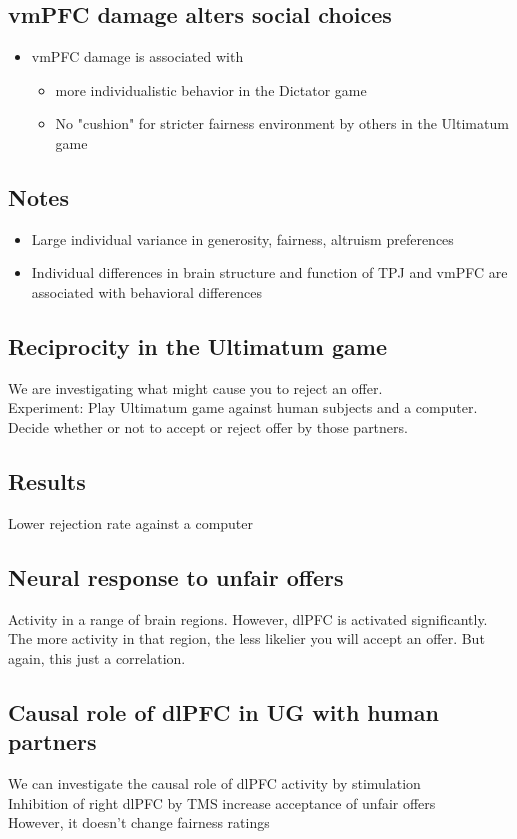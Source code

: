  \subsection{vmPFC damage alters social choices}
 \begin{itemize}
     \item vmPFC damage is associated with
     \begin{itemize}
         \item more individualistic behavior in the Dictator game
         \item No "cushion" for stricter fairness environment by others in the Ultimatum game
     \end{itemize}
 \end{itemize}

 \subsection{Notes}
 \begin{itemize}
     \item Large individual variance in generosity, fairness, altruism preferences
     \item Individual differences in brain structure and function of TPJ and vmPFC are associated with behavioral differences
 \end{itemize}
 \subsection{Reciprocity in the Ultimatum game}
 We are investigating what might cause you to reject an offer.
 \\Experiment: Play Ultimatum game against human subjects and a computer. Decide whether or not to accept or reject offer by those partners.
 \subsection{Results}
 Lower rejection rate against a computer
 \subsection{Neural response to unfair offers}
 Activity in a range of brain regions. However, dlPFC is activated significantly. The more activity in that region, the less likelier you will accept an offer. But again, this just a correlation. 
 \subsection{Causal role of dlPFC in UG with human partners}
 We can investigate the causal role of dlPFC activity by stimulation
 \\Inhibition of right dlPFC by TMS increase acceptance of unfair offers
 \\However, it doesn't change fairness ratings
